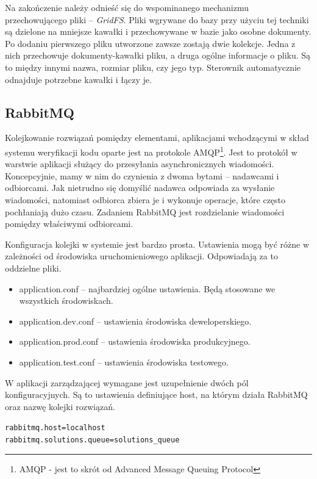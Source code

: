 \documentclass[wimgr]{xmgr}
\begin{document}
Na zakończenie należy odnieść się do wspominanego mechanizmu przechowującego pliki -- \emph{GridFS}. Pliki wgrywane do bazy przy użyciu tej techniki są dzielone na mniejsze kawałki i przechowywane w bazie jako osobne dokumenty. Po dodaniu pierwszego pliku utworzone zawsze zostają dwie kolekcje. Jedna z nich przechowuje dokumenty-kawałki pliku, a druga ogólne informacje o pliku. Są to między innymi nazwa, rozmiar pliku, czy jego typ. Sterownik automatycznie odnajduje potrzebne kawałki i łączy je. 

\subsection{RabbitMQ}

Kolejkowanie rozwiązań pomiędzy elementami, aplikacjami wchodzącymi w skład systemu weryfikacji kodu oparte jest na protokole AMQP\footnote{AMQP - jest to skrót od Advanced Message Queuing Protocol}. Jest to protokół w warstwie aplikacji służący do przesyłania asynchronicznych wiadomości. Koncepcyjnie, mamy w nim do czynienia z dwoma bytami -- nadawcami i odbiorcami. Jak nietrudno się domyślić nadawca odpowiada za wysłanie wiadomości, natomiast odbiorca zbiera je i wykonuje operacje, które często pochłaniają dużo czasu. Zadaniem RabbitMQ jest rozdzielanie wiadomości pomiędzy właściwymi odbiorcami.

Konfiguracja kolejki w systemie jest bardzo prosta. Ustawienia mogą być różne w zależności od środowiska uruchomieniowego aplikacji. Odpowiadają za to oddzielne pliki.

\begin{itemize}
\item application.conf -- najbardziej ogólne ustawienia. Będą stosowane we wszystkich środowiskach.
\item application.dev.conf -- ustawienia środowiska deweloperskiego.
\item application.prod.conf -- ustawienia środowiska produkcyjnego.
\item application.test.conf -- ustawienia środowiska testowego.
\end{itemize} 

W aplikacji zarządzającej wymagane jest uzupełnienie dwóch pól konfiguracyjnych. Są to ustawienia definiujące host, na którym działa RabbitMQ oraz nazwę kolejki rozwiązań.

\begin{alltt}
rabbitmq.host=localhost
rabbitmq.solutions.queue=solutions_queue
\end{alltt}
\end{document}

